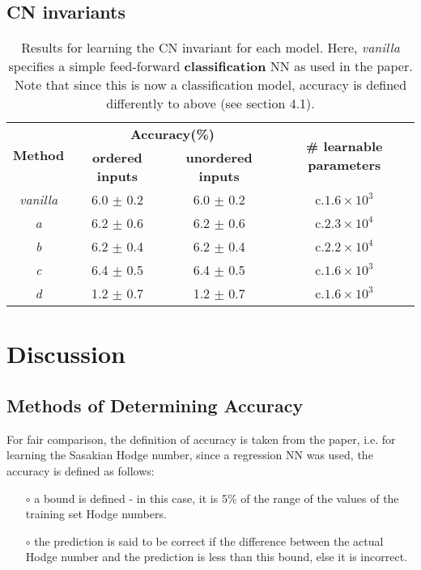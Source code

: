 \documentclass{article}
\begin{document}
\subsection{CN invariants}
\begin{table}[ht]
\centering
\begin{tabular}{|c|c|c|c|}
\hline
\multirow{2}{*}{\textbf{Method}} & \multicolumn{2}{c|}{\textbf{Accuracy(\%)} } & \multirow{2}{*}{ \textbf{\# learnable parameters}} \\ \cline{2-3}
                         & \textbf{ordered inputs} & \textbf{unordered inputs} &                        \\ \hline
\emph{vanilla} & 6.0 $\pm$ 0.2 & 6.0 $\pm$ 0.2 & c.$1.6\times 10^3$ \\ \hline
\emph{a} & 6.2 $\pm$ 0.6 & 6.2 $\pm$ 0.6 & c.$2.3\times 10^4$ \\ \hline
\emph{b} & 6.2 $\pm$ 0.4 & 6.2 $\pm$ 0.4 & c.$2.2\times 10^4$ \\ \hline
\emph{c} & 6.4 $\pm$ 0.5 & 6.4 $\pm$ 0.5 & c.$1.6\times 10^3$ \\ \hline
\emph{d} & 1.2 $\pm$ 0.7 & 1.2 $\pm$ 0.7 & c.$1.6\times 10^3$ \\ \hline
\end{tabular}
\caption{Results for learning the CN invariant for each model. Here, \emph{vanilla} specifies a simple feed-forward \textbf{classification} NN as used in the paper. Note that since this is now a classification model, accuracy is defined differently to above (see section 4.1).}
\end{table}




\section{Discussion}
\subsection{Methods of Determining Accuracy}
For fair comparison, the definition of accuracy is taken from the paper, i.e. for learning the Sasakian Hodge number, since a regression NN was used, the accuracy is defined as follows:
\begin{itemize}
    \item[$\circ$] a bound is defined - in this case, it is 5\% of the range of the values of the training set Hodge numbers.
    \item[$\circ$] the prediction is said to be correct if the difference between the actual Hodge number and the prediction is less than this bound, else it is incorrect. 
\end{itemize}
\end{document}
